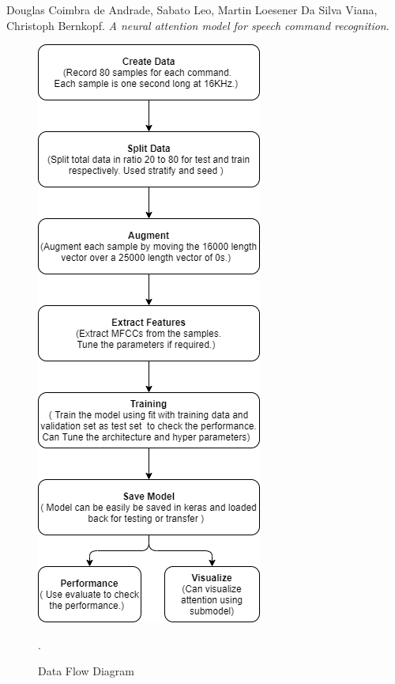 \documentclass[11pt,english]{article}
\begin{document}
\begin{thebibliography}{9}
Douglas Coimbra de Andrade, Sabato Leo, Martin Loesener Da Silva Viana, Christoph Bernkopf. 
\textit{A neural attention model for speech command recognition}. 

\end{thebibliography}
\begin{figure}[!ht]
\centering
\includegraphics[width=\columnwidth]{./Figs/Flow.png}
\caption{ Data Flow Diagram}.
\label{fig: Flow}	
\end{figure}
\end{document}
